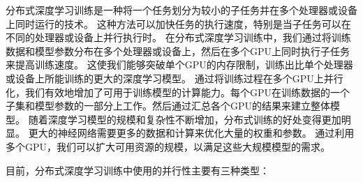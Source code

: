 分布式深度学习训练是一种将一个任务划分为较小的子任务并在多个处理器或设备上同时运行的技术。
% 
这种方法可以加快任务的执行速度，特别是当子任务可以在不同的处理器或设备上并行执行时。
% 
在分布式深度学习训练中，我们通过将训练数据和模型参数分布在多个处理器或设备上，然后在多个GPU上同时执行子任务来提高训练速度。
% 
这使我们能够突破单个GPU的内存限制，训练出比单个处理器或设备上所能训练的更大的深度学习模型。
% 
通过将训练过程在多个GPU上并行化，我们有效地增加了可用于训练模型的计算能力。每个GPU在训练数据的一个子集和模型参数的一部分上工作。然后通过汇总各个GPU的结果来建立整体模型。
% 
随着深度学习模型的规模和复杂性不断增加，分布式训练的好处变得更加明显。
% 
更大的神经网络需要更多的数据和计算来优化大量的权重和参数。
% 
通过利用多个GPU，我们可以扩大可用资源的规模，以满足这些大规模模型的需求。

目前，分布式深度学习训练中使用的并行性主要有三种类型：

